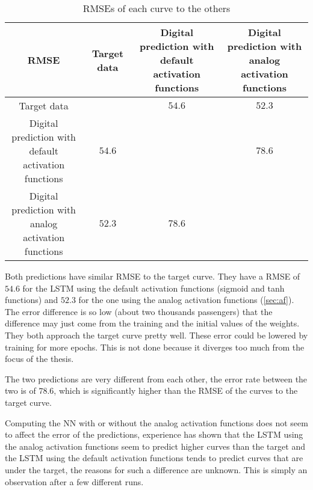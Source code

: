 \begin{table}[H]
  \centering
  \begin{tabular}{|c|c|c|c|}
    \hline
    \cellcolor[HTML]{808080}\acs{RMSE} & Target data & \specialcell{Digital prediction with\\default activation functions} & \specialcell{Digital prediction with\\analog activation functions}\\
    \hline
    Target data &\cellcolor[HTML]{202020} & $54.6$ & $52.3$\\
    \hline
    \specialcell{Digital prediction with\\default activation functions}  & $54.6$ & \cellcolor[HTML]{202020} & $78.6$\\
    \hline
    \specialcell{Digital prediction with\\analog activation functions} & $52.3$ & $78.6$ & \cellcolor[HTML]{202020}\\
    \hline
  \end{tabular}
  \caption{\acp{RMSE} of each curve to the others}
  \label{tab:airlineDigital}
\end{table}

Both predictions have similar \ac{RMSE} to the target curve. They have a \ac{RMSE} of $54.6$ for the \ac{LSTM} using the default activation functions (sigmoid and \ac{tanh} functions) and $52.3$ for the one using the analog activation functions (\cref{sec:af}). The error difference is so low (about two thousands passengers) that the difference may just come from the training and the initial values of the weights. They both approach the target curve pretty well. These error could be lowered by training for more epochs. This is not done because it diverges too much from the focus of the thesis.

The two predictions are very different from each other, the error rate between the two is of $78.6$, which is significantly higher than the \ac{RMSE} of the curves to the target curve.

Computing the \ac{NN} with or without the analog activation functions does not seem to affect the error of the predictions, experience has shown that the \ac{LSTM} using the analog activation functions seem to predict higher curves than the target and the \ac{LSTM} using the default activation functions tends to predict curves that are under the target, the reasons for such a difference are unknown. This is simply an observation after a few different runs.

